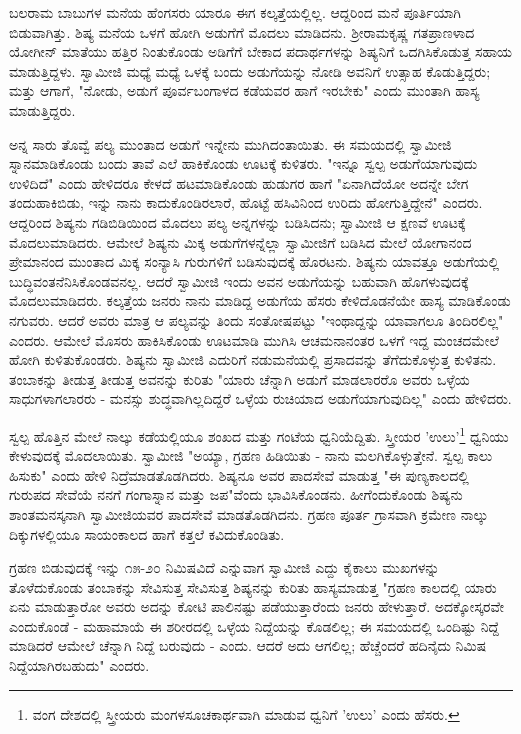 ಬಲರಾಮ ಬಾಬುಗಳ ಮನೆಯ ಹೆಂಗಸರು ಯಾರೂ ಈಗ ಕಲ್ಕತ್ತೆಯಲ್ಲಿಲ್ಲ. ಆದ್ದರಿಂದ ಮನೆ ಪೂರ್ತಿಯಾಗಿ ಬಿಡುವಾಗಿತ್ತು. ಶಿಷ್ಯ ಮನೆಯ ಒಳಗೆ ಹೋಗಿ ಅಡುಗೆಗೆ ಮೊದಲು ಮಾಡಿದನು. ಶ‍್ರೀರಾಮಕೃಷ್ಣ ಗತಪ್ರಾಣಳಾದ ಯೋಗೀನ್ ಮಾತೆಯು ಹತ್ತಿರ ನಿಂತುಕೊಂಡು ಅಡಿಗೆಗೆ ಬೇಕಾದ ಪದಾರ್ಥಗಳನ್ನು ಶಿಷ್ಯನಿಗೆ ಒದಗಿಸಿಕೊಡುತ್ತ ಸಹಾಯ ಮಾಡುತ್ತಿದ್ದಳು. ಸ್ವಾಮೀಜಿ ಮಧ್ಯೆ ಮಧ್ಯೆ ಒಳಕ್ಕೆ ಬಂದು ಅಡುಗೆಯನ್ನು ನೋಡಿ ಅವನಿಗೆ ಉತ್ಸಾಹ ಕೊಡುತ್ತಿದ್ದರು; ಮತ್ತು ಆಗಾಗೆ, "ನೋಡು, ಅಡುಗೆ ಪೂರ್ವಬಂಗಾಳದ ಕಡೆಯವರ ಹಾಗೆ ಇರಬೇಕು" ಎಂದು ಮುಂತಾಗಿ ಹಾಸ್ಯ ಮಾಡುತ್ತಿದ್ದರು.

ಅನ್ನ ಸಾರು ತೊವ್ವೆ ಪಲ್ಯ ಮುಂತಾದ ಅಡುಗೆ ಇನ್ನೇನು ಮುಗಿದಂತಾಯಿತು. ಈ ಸಮಯದಲ್ಲಿ ಸ್ವಾಮೀಜಿ ಸ್ನಾನಮಾಡಿಕೊಂಡು ಬಂದು ತಾವೆ ಎಲೆ ಹಾಕಿಕೊಂಡು ಊಟಕ್ಕೆ ಕುಳಿತರು. "ಇನ್ನೂ ಸ್ವಲ್ಪ ಅಡುಗೆಯಾಗುವುದು ಉಳಿದಿದೆ" ಎಂದು ಹೇಳಿದರೂ ಕೇಳದೆ ಹಟಮಾಡಿಕೊಂಡು ಹುಡುಗರ ಹಾಗೆ "ಏನಾಗಿದೆಯೋ ಅದನ್ನೇ ಬೇಗ ತಂದುಹಾಕಿಬಿಡು, ಇನ್ನು ನಾನು ಕಾದುಕೊಂಡಿರಲಾರೆ, ಹೊಟ್ಟೆ ಹಸಿವಿನಿಂದ ಉರಿದು ಹೋಗುತ್ತಿದ್ದೇನೆ" ಎಂದರು. ಆದ್ದರಿಂದ ಶಿಷ್ಯನು ಗಡಿಬಿಡಿಯಿಂದ ಮೊದಲು ಪಲ್ಯ ಅನ್ನಗಳನ್ನು ಬಡಿಸಿದನು; ಸ್ವಾಮೀಜಿ ಆ ಕ್ಷಣವೆ ಊಟಕ್ಕೆ ಮೊದಲುಮಾಡಿದರು. ಆಮೇಲೆ ಶಿಷ್ಯನು ಮಿಕ್ಕ ಅಡುಗೆಗಳನ್ನೆಲ್ಲಾ ಸ್ವಾಮೀಜಿಗೆ ಬಡಿಸಿದ ಮೇಲೆ ಯೋಗಾನಂದ ಪ್ರೇಮಾನಂದ ಮುಂತಾದ ಮಿಕ್ಕ ಸಂನ್ಯಾಸಿ ಗುರುಗಳಿಗೆ ಬಡಿಸುವುದಕ್ಕೆ ಹೊರಟನು. ಶಿಷ್ಯನು ಯಾವತ್ತೂ ಅಡುಗೆಯಲ್ಲಿ ಬುದ್ಧಿವಂತನೆನಿಸಿಕೊಂಡವನಲ್ಲ. ಆದರೆ ಸ್ವಾಮೀಜಿ ಇಂದು ಅವನ ಅಡುಗೆಯನ್ನು ಬಹುವಾಗಿ ಹೊಗಳುವುದಕ್ಕೆ ಮೊದಲುಮಾಡಿದರು. ಕಲ್ಕತ್ತೆಯ ಜನರು ನಾನು ಮಾಡಿದ್ದ ಅಡುಗೆಯ ಹೆಸರು ಕೇಳಿದೊಡನೆಯೇ ಹಾಸ್ಯ ಮಾಡಿಕೊಂಡು ನಗುವರು. ಆದರೆ ಅವರು ಮಾತ್ರ ಆ ಪಲ್ಯವನ್ನು ತಿಂದು ಸಂತೋಷಪಟ್ಟು "ಇಂಥಾದ್ದನ್ನು ಯಾವಾಗಲೂ ತಿಂದಿರಲಿಲ್ಲ" ಎಂದರು. ಆಮೇಲೆ ಮೊಸರು ಹಾಕಿಸಿಕೊಂಡು ಊಟಮಾಡಿ ಮುಗಿಸಿ ಆಚಮನಾನಂತರ ಒಳಗೆ ಇದ್ದ ಮಂಚದಮೇಲೆ ಹೋಗಿ ಕುಳಿತುಕೊಂಡರು. ಶಿಷ್ಯನು ಸ್ವಾಮೀಜಿ ಎದುರಿಗೆ ನಡುಮನೆಯಲ್ಲಿ ಪ್ರಸಾದವನ್ನು ತೆಗೆದುಕೊಳ್ಳುತ್ತ ಕುಳಿತನು. ತಂಬಾಕನ್ನು ತೀಡುತ್ತ ತೀಡುತ್ತ ಅವನನ್ನು ಕುರಿತು "ಯಾರು ಚೆನ್ನಾಗಿ ಅಡುಗೆ ಮಾಡಲಾರರೊ ಅವರು ಒಳ್ಳೆಯ ಸಾಧುಗಳಾಗಲಾರರು - ಮನಸ್ಸು ಶುದ್ಧವಾಗಿಲ್ಲದಿದ್ದರೆ ಒಳ್ಳೆಯ ರುಚಿಯಾದ ಅಡುಗೆಯಾಗುವುದಿಲ್ಲ" ಎಂದು ಹೇಳಿದರು.

ಸ್ವಲ್ಪ ಹೊತ್ತಿನ ಮೇಲೆ ನಾಲ್ಕು ಕಡೆಯಲ್ಲಿಯೂ ಶಂಖದ ಮತ್ತು ಗಂಟೆಯ ಧ್ವನಿಯೆದ್ದಿತು. ಸ್ತ್ರೀಯರ 'ಉಲು'\footnote{ವಂಗ ದೇಶದಲ್ಲಿ ಸ್ತ್ರೀಯರು ಮಂಗಳಸೂಚಕಾರ್ಥವಾಗಿ ಮಾಡುವ ಧ್ವನಿಗೆ 'ಉಲು' ಎಂದು ಹೆಸರು.} ಧ್ವನಿಯು ಕೇಳುವುದಕ್ಕೆ ಮೊದಲಾಯಿತು. ಸ್ವಾಮೀಜಿ "ಅಯ್ಯಾ, ಗ್ರಹಣ ಹಿಡಿಯಿತು - ನಾನು ಮಲಗಿಕೊಳ್ಳುತ್ತೇನೆ. ಸ್ವಲ್ಪ ಕಾಲು ಹಿಸುಕು" ಎಂದು ಹೇಳಿ ನಿದ್ರೆಮಾಡತೊಡಗಿದರು. ಶಿಷ್ಯನೂ ಅವರ ಪಾದಸೇವೆ ಮಾಡುತ್ತ "ಈ ಪುಣ್ಯಕಾಲದಲ್ಲಿ ಗುರುಪದ ಸೇವೆಯೆ ನನಗೆ ಗಂಗಾಸ್ನಾನ ಮತ್ತು ಜಪ"ವೆಂದು ಭಾವಿಸಿಕೊಂಡನು. ಹೀಗೆಂದುಕೊಂಡು ಶಿಷ್ಯನು ಶಾಂತಮನಸ್ಕನಾಗಿ ಸ್ವಾಮೀಜಿಯವರ ಪಾದಸೇವೆ ಮಾಡತೊಡಗಿದನು. ಗ್ರಹಣ ಪೂರ್ತ ಗ್ರಾಸವಾಗಿ ಕ್ರಮೇಣ ನಾಲ್ಕು ದಿಕ್ಕುಗಳಲ್ಲಿಯೂ ಸಾಯಂಕಾಲದ ಹಾಗೆ ಕತ್ತಲೆ ಕವಿದುಕೊಂಡಿತು.

ಗ್ರಹಣ ಬಿಡುವುದಕ್ಕೆ ಇನ್ನು ೧೫-೨೦ ನಿಮಿಷವಿದೆ ಎನ್ನುವಾಗ ಸ್ವಾಮೀಜಿ ಎದ್ದು ಕೈಕಾಲು ಮುಖಗಳನ್ನು ತೊಳೆದುಕೊಂಡು ತಂಬಾಕನ್ನು ಸೇವಿಸುತ್ತ ಸೇವಿಸುತ್ತ ಶಿಷ್ಯನನ್ನು ಕುರಿತು ಹಾಸ್ಯಮಾಡುತ್ತ "ಗ್ರಹಣ ಕಾಲದಲ್ಲಿ ಯಾರು ಏನು ಮಾಡುತ್ತಾರೋ ಅವರು ಅದನ್ನು ಕೋಟಿ ಪಾಲಿನಷ್ಟು ಪಡೆಯುತ್ತಾರೆಂದು ಜನರು ಹೇಳುತ್ತಾರೆ. ಅದಕ್ಕೋಸ್ಕರವೇ ಎಂದುಕೊಂಡೆ - ಮಹಾಮಾಯೆ ಈ ಶರೀರದಲ್ಲಿ ಒಳ್ಳೆಯ ನಿದ್ದೆಯನ್ನು ಕೊಡಲಿಲ್ಲ; ಈ ಸಮಯದಲ್ಲಿ ಒಂದಿಷ್ಟು ನಿದ್ದೆ ಮಾಡಿದರೆ ಆಮೇಲೆ ಚೆನ್ನಾಗಿ ನಿದ್ದೆ ಬರುವುದು - ಎಂದು. ಆದರೆ ಅದು ಆಗಲಿಲ್ಲ; ಹೆಚ್ಚೆಂದರೆ ಹದಿನೈದು ನಿಮಿಷ ನಿದ್ದೆಯಾಗಿರಬಹುದು" ಎಂದರು.

